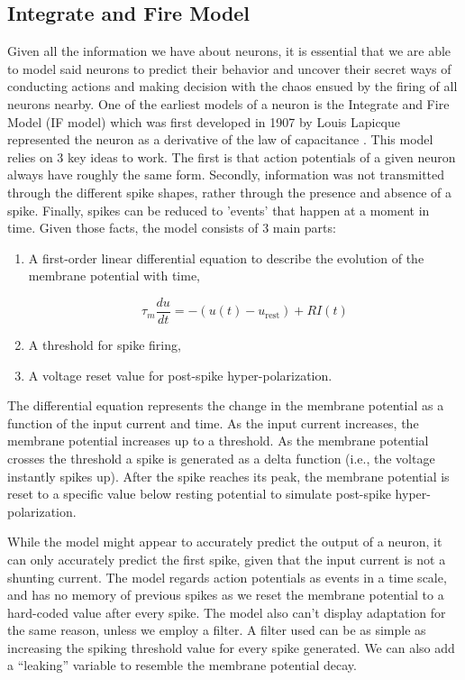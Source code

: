 \documentclass[11pt]{article}
\begin{document}
\subsection{Integrate and Fire Model}
\label{sec:integrate_and_fire}
Given all the information we have about neurons, it is essential that we are able to model said neurons to predict their behavior and uncover their secret ways of conducting actions and making decision with the chaos ensued by the firing of all neurons nearby. One of the earliest models of a neuron is the Integrate and Fire Model (IF model) which was first developed in 1907 by Louis Lapicque represented the neuron as a derivative of the law of capacitance \citep{lapicque}. This model relies on 3 key ideas to work. The first is that action potentials of a given neuron always have roughly the same form. Secondly, information was not transmitted through the different spike shapes, rather through the presence and absence of a spike. Finally, spikes can be reduced to 'events' that happen at a moment in time. Given those facts, the model consists of 3 main parts:

\begin{enumerate}[1)]
    \item A first-order linear differential equation to describe the evolution of the membrane potential with time,
    
    \begin{equation}
        \tau_m \frac{du}{dt} = - (u(t) - u_\text{rest}) + RI(t)
        \label{eq:integrate_and_fire}
    \end{equation}
    
    \item A threshold for spike firing,
    \item A voltage reset value for post-spike hyper-polarization.
\end{enumerate}

The differential equation represents the change in the membrane potential as a function of the input current and time. As the input current increases, the membrane potential increases up to a threshold. As the membrane potential crosses the threshold a spike is generated as a delta function (i.e., the voltage instantly spikes up). After the spike reaches its peak, the membrane potential is reset to a specific value below resting potential to simulate post-spike hyper-polarization.

While the model might appear to accurately predict the output of a neuron, it can only accurately predict the first spike, given that the input current is not a shunting current. The model regards action potentials as events in a time scale, and has no memory of previous spikes as we reset the membrane potential to a hard-coded value after every spike. The model also can't display adaptation for the same reason, unless we employ a filter. A filter used can be as simple as increasing the spiking threshold value for every spike generated. We can also add a ``leaking'' variable to resemble the membrane potential decay.
\end{document}
